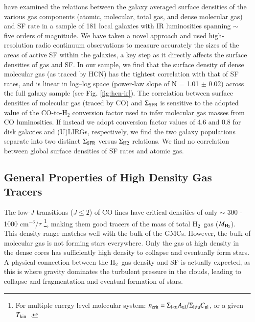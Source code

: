 \documentclass[legal,11pt]{article}
\def\cmt   {cm$^{-3}$\,}
\def\,{\thinspace}
\def\Htwo{H$_2$}
\def\MHtwo{$M_{\rm H_2}$}
\def\Tkin{$T_{\rm kin}$}
\def\Htwo       {H$_2$}
\begin{document}
\cite{lgg2015} have examined the relations between the galaxy averaged surface
densities of the various gas components (atomic, molecular, total gas, and
dense molecular gas) and SF rate in a sample of 181 local galaxies with IR
luminosities spanning $\sim$ five orders of magnitude. We have taken a novel
approach and used high-resolution radio continuum observations to measure
accurately the sizes of the areas of active SF within the galaxies, a key step
as it directly affects the surface densities of gas and SF. In our
sample, we find that the surface density of dense molecular gas (as traced by
HCN) has the tightest correlation with that of SF rates, and is linear in
log--log space (power-law slope of N = 1.01 $\pm$ 0.02) across the full galaxy
sample (see Fig. \ref{fig:hcn-ir}). The correlation between surface densities
of molecular gas (traced by CO) and $\Sigma_{\rm SFR}$ is sensitive to the
adopted value of the CO-to-H$_2$ conversion factor used to infer molecular gas
masses from CO luminosities. If instead we adopt conversion factor values  of
4.6 and 0.8 for disk galaxies and (U)LIRGs, respectively, we find the two
galaxy populations separate into two distinct $\Sigma_{\rm SFR}$  versus
$\Sigma_{\rm H2}$ relations. We find no correlation between global surface
densities of SF rates and atomic gas.

\subsection{General Properties of High Density Gas Tracers  }

The low-$J$ transitions ($J\le2$) of CO lines have critical densities of only
$\sim$ 300 - 1000 \cmt/$\tau$ \footnote{For multiple energy level molecular
system: $n_{\rm crit}={\Sigma_{\rm l<u} A_{\rm ul}}/{\Sigma_{\rm l\neq u}
C_{\rm ul}}$, or a given \Tkin\ \citep{Jansen1995, Osterbrock2006}.}, making them good
tracers of the mass of total \Htwo\ gas (\MHtwo). This density range matches
well with the bulk of the GMCs. However, the bulk of molecular gas is not
forming stars everywhere.  Only the gas at high density in the dense cores has
sufficiently high density to collapse and eventually form stars.  A physical
connection between the \Htwo\ gas density and SF is actually expected, as this is 
where gravity dominates the turbulent pressure in the clouds, leading to collapse and 
fragmentation and eventual formation of stars.



\end{document}
